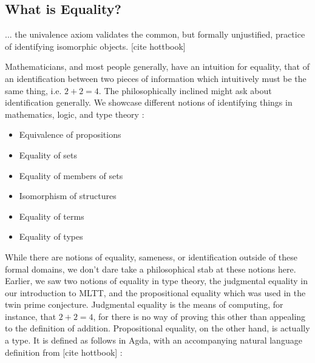 \subsection{What is Equality?} \label{e}


\begin{displayquote}
... the univalence axiom validates the common, but formally unjustified, practice
of identifying isomorphic objects. [cite hottbook]
\end{displayquote}


Mathematicians, and most people generally, have an intuition
for equality, that of an identification between two pieces of information
which intuitively must be the same thing, i.e. $2+2=4$. The philosophically
inclined might ask about identification generally. We showcase different
notions of identifying things in mathematics, logic, and type theory :

\begin{itemize}
\item Equivalence of propositions
\item Equality of sets
\item Equality of members of sets
\item Isomorphism of structures
\item Equality of terms
\item Equality of types
\end{itemize}

While there are notions of equality, sameness, or identification outside of
these formal domains, we don't dare take a philosophical stab at these notions here.
Earlier, we saw two notions of equality in type theory, the judgmental equality
in our introduction to MLTT, and the propositional equality which was used in
the twin prime conjecture. Judgmental equality is the means of computing, for
instance, that $2+2=4$, for there is no way of proving this other than appealing
to the definition of addition. Propositional equality, on the other hand, is
actually a type. It is defined as follows in Agda, with an accompanying natural
language definition from [cite hottbook] :

